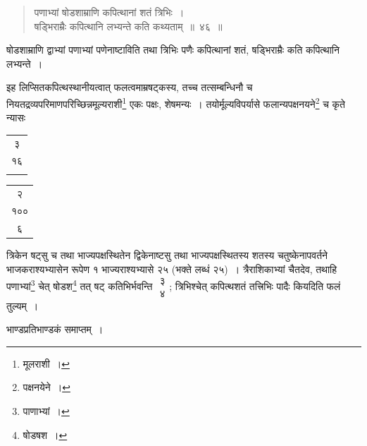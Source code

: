 \documentclass[10pt, openany]{book}
\begin{document}
{{\begin{quote}
    
{\eg पणाभ्यां षोडशाम्राणि कपित्थानां शतं त्रिभिः~। \\
 षड्भिराम्रैः कपित्थानि लभ्यन्ते कति कथ्यताम्~॥~४६~॥}\end{quote} 

{षोडशाम्राणि द्वाभ्यां पणाभ्यां पणेनाष्टाविति तथा त्रिभिः पणैः
कपित्थानां शतं,}
{षड्भिराम्रैः कति कपित्थानि लभ्यन्ते~।}


\newpage

{इह लिप्सितकपित्थस्थानीयत्वात् फलत्वमाम्रषट्कस्य, तच्च तत्सम्बन्धिनौ च
नियतद्रव्यपरिमाणपरिच्छिन्नमूल्यराशी\renewcommand{\thefootnote}{\s १}\footnote{\s *मूलराशी~।} एकः पक्षः, शेषमन्यः~।
तयोर्मूल्यविपर्यासे फलान्यपक्षनयने\renewcommand{\thefootnote}{\s २}\footnote{\s *पक्षनयेने~।}}
{च कृते न्यासः\textendash }

\hspace{40mm} \begin{tabular}{c} ३  \\१६ \\ \\ \end{tabular}\begin{tabular}{c} २ \\ १००\\६\end{tabular}

\vspace{0.1cm}{अत्र \,भाज्यपक्षस्थितेन \,द्विकेन \,भाजकपक्षस्थितेषु \,षोडशस्वपवर्तितेषु \,भाजकपक्षस्थितेन}
{त्रिकेन षट्सु च तथा भाज्यपक्षस्थितेन द्विकेनाष्टसु तथा
भाज्यपक्षस्थितस्य शतस्य}
{चतुष्केनापवर्तने भाजकराश्यभ्यासेन रूपेण १ भाज्यराश्यभ्यासे २५ (भक्ते
लब्धं २५)~।}
{त्रैराशिकाभ्यां चैतदेव, तथाहि पणाभ्यां\renewcommand{\thefootnote}{\s ३}\footnote{\s पाणाभ्यां~।}  चेत् षोडश\renewcommand{\thefootnote}{\s ४}\footnote{\s षोडषश~।}  तत् षट्
कतिभिर्भवन्ति $\begin{matrix}

\mbox{{३}}\\

\mbox{{४}}

\end{matrix}$; त्रिभिश्चेत्}
{कपित्थशतं तत्त्रिभिः पादैः कियदिति फलं तुल्यम्~।}

\begin{center}{भाण्डप्रतिभाण्डकं समाप्तम्~।}
\end{center}
\vspace{2mm}

}}
\end{document}
